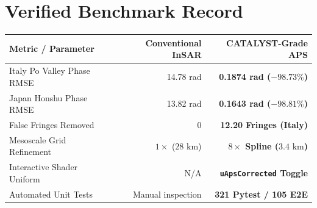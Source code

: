 \documentclass[10pt,letterpaper]{article}
\begin{document}
\begin{minipage}[t]{0.51\textwidth}
    \section*{Verified Benchmark Record}
    \footnotesize
    \begin{tabularx}{\linewidth}{X r r}
        \toprule
        \textbf{Metric / Parameter} & \textbf{Conventional InSAR} & \textbf{CATALYST-Grade APS} \\
        \midrule
        Italy Po Valley Phase RMSE & 14.78 rad & \textbf{0.1874 rad ($-98.73\%$)} \\
        Japan Honshu Phase RMSE & 13.82 rad & \textbf{0.1643 rad ($-98.81\%$)} \\
        False Fringes Removed & 0 & \textbf{12.20 Fringes (Italy)} \\
        Mesoscale Grid Refinement & $1\times$ ($28\text{ km}$) & \textbf{$8\times$ Spline ($3.4\text{ km}$)} \\
        Interactive Shader Uniform & N/A & \textbf{\texttt{uApsCorrected} Toggle} \\
        Automated Unit Tests & Manual inspection & \textbf{321 Pytest / 105 E2E} \\
        \bottomrule
    \end{tabularx}
\end{minipage}
\hfill
\end{document}
